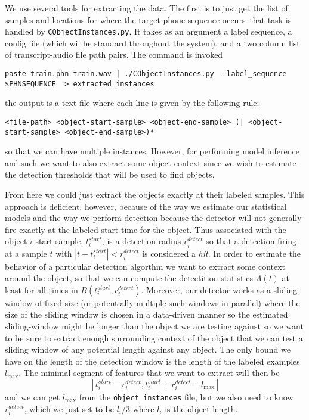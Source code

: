 \documentclass{article}
\begin{document}
We use several tools for extracting the data. The first is to just get the list of samples and locations for where the 
target phone sequence occurs--that task is handled by \texttt{CObjectInstances.py}. It takes as an argument a label sequence, a config file
(which wil be standard throughout the system), and a two column list of transcript-audio file path pairs. The command is invoked
\begin{verbatim}
paste train.phn train.wav | ./CObjectInstances.py --label_sequence $PHNSEQUENCE  > extracted_instances
\end{verbatim}
the output is a text file where each line is given by the following rule:
\begin{verbatim}
<file-path> <object-start-sample> <object-end-sample> (| <object-start-sample> <object-end-sample>)*
\end{verbatim}
so that we can have multiple instances.  However, for performing model inference and such we want to also extract some object context
since we wish to estimate the detection thresholds that will be used to find objects.

From here we could just extract the objects exactly at
their labeled samples.  This approach is deficient, however,
because of the way we estimate our statistical models and the
way we perform detection because the detector will not generally
fire exactly at the labeled start time for the object.  Thus
associated with the object $i$ start sample, $t_i^{start}$, is a detection
radius $r_i^{detect}$ so that a detection firing at a sample
$t$ with $|t-t_i^{start}|<r_i^{detect}$ is considered a \textit{hit}.
In order to estimate the behavior of a particular detection
algorthm
we want to extract some context around the object, so that
we can compute the detectition statistics $\Lambda(t)$ at least
for all times in $B(t_i^{start},r_i^{detect})$.  Moreover,
our detector works as a sliding-window of fixed size
(or potentially multiple such windows in parallel) where the size
of the sliding window is chosen in a data-driven manner so the
estimated sliding-window might be longer than the object we are
testing against so we want to be sure to extract enough surrounding
context of the object that we can test a sliding window of any
potential length against any object.  The only bound we have
on the length of the detection window is the length of the
labeled examples $l_{\max}$.  The minimal segment of features
that we want to extract will then be
$$[t_i^{start}-r_i^{detect},t_i^{start}+r_i^{detect}+l_{\max}]$$
and we can get $l_{\max}$ from the \texttt{object\_instances} file,
but we also need to know $r_i^{detect}$, which we just set to be
$l_i/3$ where $l_i$ is the object length.
\end{document}
